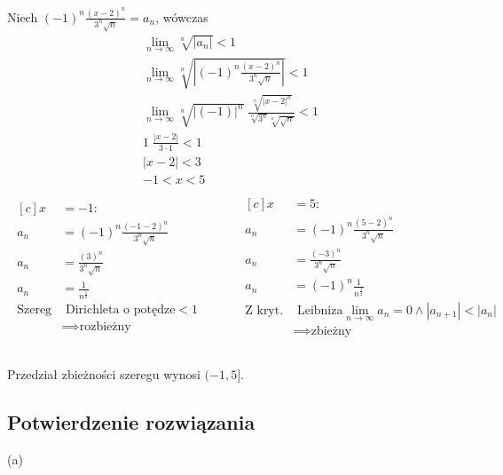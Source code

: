 \documentclass[12pt]{article}
\begin{document}
Niech $\displaystyle (-1)^n \frac{(x-2)^n}{3^n\sqrt{n}} = a_n$, wówczas
\begin{align*}
    \lim_{n\to\infty} \sqrt[n]{|a_n|} < 1 \\
    \lim_{n\to\infty} \sqrt[n]{|(-1)^n \frac{(x-2)^n}{3^n\sqrt{n}}|} < 1 \\
    \lim_{n\to\infty} \sqrt[n]{|(-1)|^n} \; \frac{\sqrt[n]{|x-2|^n}}{\sqrt[n]{3^n}\sqrt[n]{\sqrt{n}}} < 1 \\
    1 \; \frac{|x-2|}{3 \cdot 1} < 1 \\
    |x-2| < 3 \\
    -1 < x < 5 \\
\end{align*}
\begin{align*}
\begin{aligned}[c]
    x &= -1: \\
    a_n &= (-1)^n \frac{(-1-2)^n}{3^n\sqrt{n}} \\
    a_n &= \frac{(3)^n}{3^n\sqrt{n}} \\
    a_n &= \frac{1}{n^{\frac{1}{2}}} \\
    \text{Szereg} &\text{ Dirichleta o potędze} < 1\\
    &\implies \text{rozbieżny} \\
\end{aligned}
\quad\quad\quad
\begin{aligned}[c]
    x &= 5: \\
    a_n &= (-1)^n \frac{(5-2)^n}{3^n\sqrt{n}} \\
    a_n &= \frac{(-3)^n}{3^n\sqrt{n}} \\
    a_n &= (-1)^n\frac{1}{n^{\frac{1}{2}}} \\
    \text{Z kryt.} &\text{ Leibniza} \lim_{n\to\infty}a_n = 0 \land |a_{n+1}| < |a_{n}| \\
    &\implies \text{zbieżny} \\
\end{aligned} \\
\end{align*}

Przedział zbieżności szeregu wynosi $(-1, 5]$.
\pagebreak

\subsection{Potwierdzenie rozwiązania}
(a)
\end{document}
